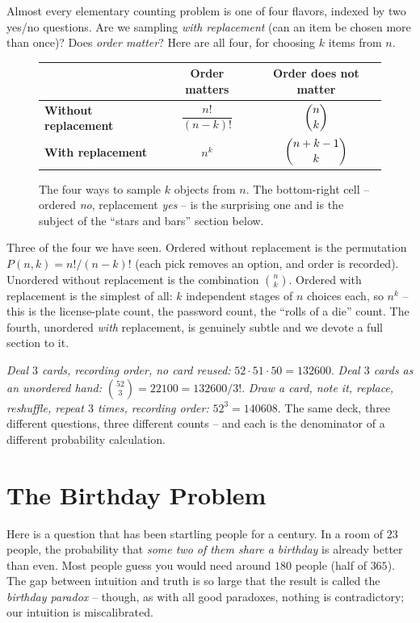 Almost every elementary counting problem is one of four flavors, indexed by two yes/no
questions. Are we sampling \emph{with replacement} (can an item be chosen more than once)?
Does \emph{order matter}? Here are all four, for choosing $k$ items from $n$.

\begin{figure}[H]
\centering
\renewcommand{\arraystretch}{1.8}
\begin{tabular}{l|c|c}
 & \textbf{Order matters} & \textbf{Order does not matter} \\
\hline
\textbf{Without replacement} & $\dfrac{n!}{(n-k)!}$ & $\dbinom{n}{k}$ \\
\hline
\textbf{With replacement} & $n^k$ & $\dbinom{n+k-1}{k}$ \\
\end{tabular}
\caption{The four ways to sample $k$ objects from $n$. The bottom-right cell -- ordered
\emph{no}, replacement \emph{yes} -- is the surprising one and is the subject of the
``stars and bars'' section below.}
\label{ch2:fig-four}
\end{figure}

Three of the four we have seen. Ordered without replacement is the permutation
$P(n,k) = n!/(n-k)!$ (each pick removes an option, and order is recorded). Unordered without
replacement is the combination $\binom{n}{k}$. Ordered with replacement is the simplest of
all: $k$ independent stages of $n$ choices each, so $n^k$ -- this is the license-plate count,
the password count, the ``rolls of a die'' count. The fourth, unordered \emph{with}
replacement, is genuinely subtle and we devote a full section to it.

\begin{example}
\label{ch2:ex-three}
\emph{Deal $3$ cards, recording order, no card reused:} $52 \cdot 51 \cdot 50 = 132600$.
\emph{Deal $3$ cards as an unordered hand:} $\binom{52}{3} = 22100 = 132600/3!$.
\emph{Draw a card, note it, replace, reshuffle, repeat $3$ times, recording order:}
$52^3 = 140608$. The same deck, three different questions, three different counts -- and
each is the denominator of a different probability calculation.
\end{example}

\section{The Birthday Problem}
\label{ch2:birthday}

Here is a question that has been startling people for a century. In a room of $23$
people, the probability that \emph{some two of them share a birthday} is already better
than even. Most people guess you would need around $180$ people (half of $365$). The gap
between intuition and truth is so large that the result is called the \emph{birthday
paradox} -- though, as with all good paradoxes, nothing is contradictory; our
intuition is miscalibrated.

